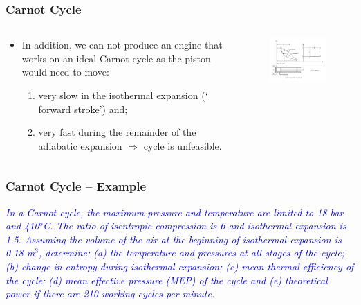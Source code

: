 \documentclass[10pt,compress]{beamer}
\begin{document}
\begin{frame}
 \frametitle{Carnot Cycle}
 \begin{columns}
  \begin{column}[c]{0.4\linewidth}
   \begin{itemize}
    \item <1-> In addition, we can not produce an engine that works on an ideal Carnot cycle as the piston would need to move:
     \begin{enumerate}
      \item <2-> very slow in the isothermal expansion ($\lq$forward stroke') and;
      \item <3-> very fast during the remainder of the adiabatic expansion $\Longrightarrow$ cycle is unfeasible.
     \end{enumerate}
   \end{itemize}
  \end{column}
  \begin{column}[c]{0.6\linewidth}
   \begin{figure}%
    \begin{center}
     \includegraphics[width=7.5cm,clip]{./Pics/GasCycle_CarnotCycle}
    \end{center}
   \end{figure}  
  \end{column}  
 \end{columns}
\end{frame}


\begin{frame}
 \frametitle{Carnot Cycle -- Example}
\textcolor{blue}{{\it In a Carnot cycle, the maximum pressure and temperature are limited to 18 bar and 410$^{o}$C. The ratio of isentropic compression is 6 and isothermal expansion is 1.5. Assuming the volume of the air at the beginning of isothermal expansion is 0.18 m$^{3}$, determine: (a) the temperature and pressures at all stages of the cycle; (b) change in entropy during isothermal expansion; (c) mean thermal efficiency of the cycle; (d) mean effective pressure (MEP) of the cycle and (e) theoretical power if there are 210 working cycles per minute.}}

\end{frame}
\end{document}
